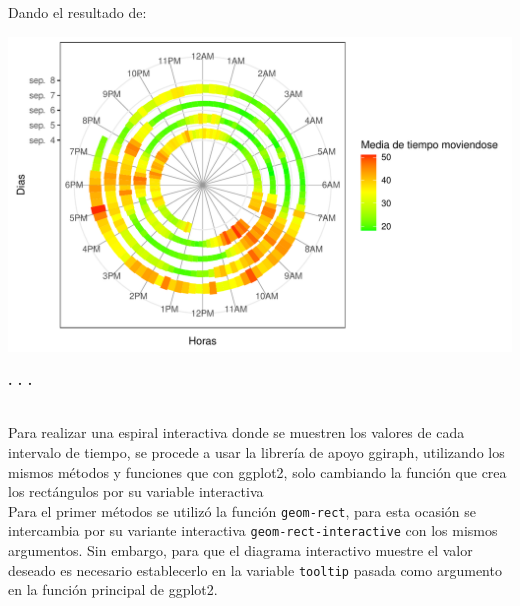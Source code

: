 \documentclass{article}\usepackage[]{graphicx}\usepackage[]{color}
\makeatletter
\def\maxwidth{ %
  \ifdim\Gin@nat@width>\linewidth
    \linewidth
  \else
    \Gin@nat@width
  \fi
}
\newenvironment{knitrout}{}{} %
\makeatother
\begin{document}
\clearpage
Dando el resultado de:~\\
\begin{knitrout}
\color{fgcolor}

{\centering \includegraphics[width=\maxwidth]{figure/plot_title-1} 

}



\end{knitrout}
\begin{center}
\textbf{. . .}
\end{center}
~\\
Para realizar una espiral interactiva donde se muestren los valores de cada intervalo de tiempo, se procede a usar la librer\'ia de apoyo ggiraph, utilizando los mismos m\'etodos y funciones que con ggplot2, solo cambiando la funci\'on que crea los rect\'angulos por su variable interactiva~\\
Para el primer m\'etodos se utiliz\'o la funci\'on \texttt{geom-rect}, para esta ocasi\'on se intercambia por su variante interactiva \texttt{geom-rect-interactive} con los mismos argumentos. Sin embargo, para que el diagrama interactivo muestre el valor deseado es necesario establecerlo en la variable \texttt{tooltip} pasada como argumento en la funci\'on principal de ggplot2.
\clearpage
\end{document}
